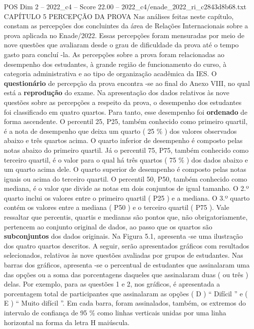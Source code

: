 \begin{textsample}{POS Dim 2 – 2022\_c4 – Score 22.00 – 2022\_c4/enade\_2022\_ri\_c2843d8b68.txt}  \label{ex:f2_pos_030}
CAPÍTULO 5 PERCEPÇÃO DA PROVA Nas análises feitas neste capítulo, constam as percepções dos concluintes da área de Relações Internacionais sobre a prova aplicada no Enade/2022.
Essas percepções foram mensuradas por meio de nove questões que avaliaram desde o grau de dificuldade da prova até o tempo gasto para concluí -la.
As percepções sobre a prova foram relacionadas ao desempenho dos estudantes, à grande região de funcionamento do curso, à categoria administrativa e ao tipo de organização acadêmica da IES.
O \textbf{questionário} de percepção da prova encontra -se ao final do Anexo VIII, no qual está a \textbf{reprodução} do exame.
Na apresentação dos dados relativos às nove questões sobre as percepções a respeito da prova, o desempenho dos estudantes foi classificado em quatro quartos.
Para tanto, esse desempenho foi \textbf{ordenado} de forma ascendente.
O percentil 25, P25, também conhecido como primeiro quartil, é a nota de desempenho que deixa um quarto ( 25 \% ) dos valores observados abaixo e três quartos acima.
O quarto inferior de desempenho é composto pelas notas abaixo do primeiro quartil.
Já o percentil 75, P75, também conhecido como terceiro quartil, é o valor para o qual há três quartos ( 75 \% ) dos dados abaixo e um quarto acima dele.
O quarto superior de desempenho é composto pelas notas iguais ou acima do terceiro quartil.
O percentil 50, P50, também conhecido como mediana, é o valor que divide as notas em dois conjuntos de igual tamanho.
O 2.º quarto inclui os valores entre o primeiro quartil ( P25 ) e a mediana.
O 3.º quarto contém os valores entre a mediana ( P50 ) e o terceiro quartil ( P75 ).
Vale ressaltar que percentis, quartis e medianas são pontos que, não obrigatoriamente, pertencem ao conjunto original de dados, ao passo que os quartos são \textbf{subconjuntos} dos dados originais.
Na Figura 5.1, apresenta -se uma ilustração dos quatro quartos descritos.
A seguir, serão apresentados gráficos com resultados selecionados, relativos às nove questões avaliadas por grupos de estudantes.
Nas barras dos gráficos, apresenta -se o percentual de estudantes que assinalaram uma das opções ou a soma das porcentagens daqueles que assinalaram duas ( ou três ) delas.
Por exemplo, para as questões 1 e 2, nos gráficos, é apresentada a porcentagem total de participantes que assinalaram as opções ( D ) “ Difícil ” e ( E ) “ Muito difícil ”.
Em cada barra, foram assinalados, também, os extremos do intervalo de confiança de 95 \% como linhas verticais unidas por uma linha horizontal na forma da letra H maiúscula.

\end{textsample}
